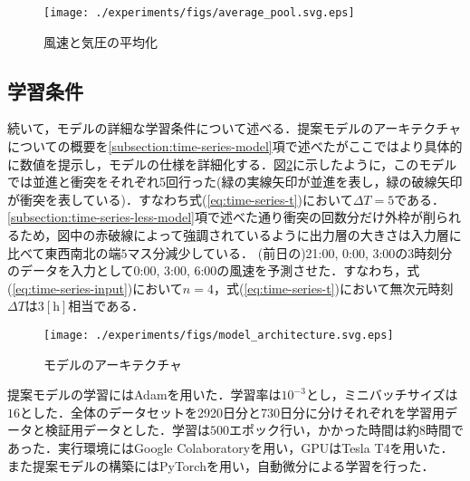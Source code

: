 \begin{figure}[bp]
  \centering
  \texttt{[image: ./experiments/figs/average\_pool.svg.eps]}
  \caption{風速と気圧の平均化}
  \label{fig:exp-averaging}
\end{figure}


\subsection{学習条件 \label{subsection:exp-condition}}

続いて，モデルの詳細な学習条件について述べる．提案モデルのアーキテクチャについての概要を\ref{subsection:time-series-model}項で述べたがここではより具体的に数値を提示し，モデルの仕様を詳細化する．図\ref{fig:exp-model-architecture}に示したように，このモデルでは並進と衝突をそれぞれ5回行った(緑の実線矢印が並進を表し，緑の破線矢印が衝突を表している)．すなわち式(\ref{eq:time-series-t})において$\Delta T = 5$である．\ref{subsection:time-series-less-model}項で述べた通り衝突の回数分だけ外枠が削られるため，図中の赤破線によって強調されているように出力層の大きさは入力層に比べて東西南北の端$5$マス分減少している．
(前日の)21:00, 0:00, 3:00の3時刻分のデータを入力として0:00, 3:00, 6:00の風速を予測させた．すなわち，式(\ref{eq:time-series-input})において$n=4$，式(\ref{eq:time-series-t})において無次元時刻$\Delta T$は$3[\mathrm{h}]$相当である．

\begin{figure}[bp]
  \centering
  \texttt{[image: ./experiments/figs/model\_architecture.svg.eps]}
  \caption{モデルのアーキテクチャ}
  \label{fig:exp-model-architecture}
\end{figure}


提案モデルの学習にはAdam\cite{Kingma2014AdamAM}を用いた．学習率は$10^{-3}$とし，ミニバッチサイズは$16$とした．全体のデータセットを2920日分と730日分に分けそれぞれを学習用データと検証用データとした．学習は$500$エポック行い，かかった時間は約8時間であった．実行環境にはGoogle Colaboratory\cite{GoogleColaboratory}を用い，GPUはTesla T4を用いた．また提案モデルの構築にはPyTorch\cite{NEURIPS2019-9015}を用い，自動微分による学習を行った．

